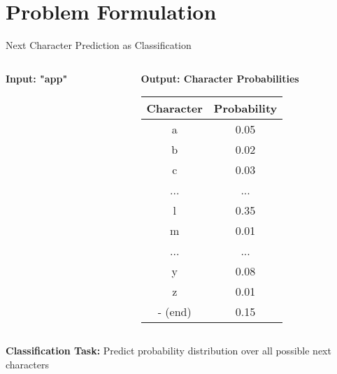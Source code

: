\documentclass[usenames,dvipsnames]{beamer}
\begin{document}
\section{Problem Formulation}

\begin{frame}{Next Character Prediction as Classification}
\begin{columns}
\begin{column}{0.3\textwidth}
\begin{center}

\vspace{0.5cm}
\textbf{Input: "app"}
\end{center}
\end{column}

\begin{column}{0.7\textwidth}
\begin{center}
\textbf{Output: Character Probabilities}
\vspace{0.3cm}

\begin{tabular}{|c|c|}
\hline
\textbf{Character} & \textbf{Probability} \\
\hline
a & 0.05 \\
b & 0.02 \\
c & 0.03 \\
... & ... \\
l & 0.35 \\
m & 0.01 \\
... & ... \\
y & 0.08 \\
z & 0.01 \\
- (end) & 0.15 \\
\hline
\end{tabular}
\end{center}
\end{column}
\end{columns}

\vspace{0.5cm}
\begin{center}
\textbf{Classification Task:} Predict probability distribution over all possible next characters
\end{center}
\end{frame}
\end{document}
